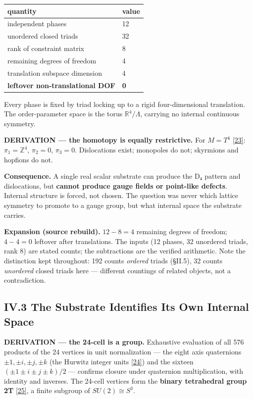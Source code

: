 \documentclass[a4paper,11pt]{article}
\newcommand{\expansion}[1]{\par\smallskip\noindent\textbf{Expansion (source rebuild).} #1\par\smallskip}
\begin{document}
\begin{center}
\begin{tabular}{ll}
\hline
quantity & value \\
\hline
independent phases & 12 \\
unordered closed triads & 32 \\
rank of constraint matrix & 8 \\
remaining degrees of freedom & 4 \\
translation subspace dimension & 4 \\
\textbf{leftover non-translational DOF} & \textbf{0} \\
\hline
\end{tabular}
\end{center}

Every phase is fixed by triad locking up to a rigid four-dimensional translation. The order-parameter space is the torus $\mathbb{R}^4/\Lambda$, carrying no internal continuous symmetry.

\textbf{DERIVATION — the homotopy is equally restrictive.} For $M=T^4$ \hyperref[ref23]{[23]}: $\pi_1=\mathbb{Z}^4$, $\pi_2=0$, $\pi_3=0$. Dislocations exist; monopoles do not; skyrmions and hopfions do not.

\textbf{Consequence.} A single real scalar substrate can produce the D₄ pattern and dislocations, but \textbf{cannot produce gauge fields or point-like defects}. Internal structure is forced, not chosen. The question was never which lattice symmetry to promote to a gauge group, but what internal space the substrate carries.


\expansion{$12 - 8 = 4$ remaining degrees of freedom; $4 - 4 = 0$ leftover after translations. The inputs (12 phases, 32 unordered triads, rank 8) are stated counts; the subtractions are the verified arithmetic. Note the distinction kept throughout: 192 counts \emph{ordered} triads (\S II.5), 32 counts \emph{unordered} closed triads here --- different countings of related objects, not a contradiction.}
\subsection*{IV.3 The Substrate Identifies Its Own Internal Space}

\textbf{DERIVATION — the 24-cell is a group.} Exhaustive evaluation of all 576 products of the 24 vertices in unit normalization — the eight axis quaternions $\pm1,\pm i,\pm j,\pm k$ (the Hurwitz integer units \hyperref[ref24]{[24]}) and the sixteen $(\pm1\pm i\pm j\pm k)/2$ — confirms closure under quaternion multiplication, with identity and inverses. The 24-cell vertices form the \textbf{binary tetrahedral group 2T} \hyperref[ref25]{[25]}, a finite subgroup of $SU(2)\cong S^3$.
\end{document}
